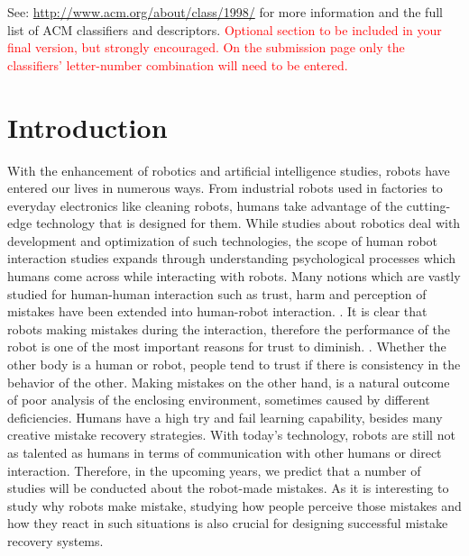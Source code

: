 \documentclass{sigchi}
\begin{document}

See: \url{http://www.acm.org/about/class/1998/}
for more information and the full list of ACM classifiers
and descriptors. \newline
\textcolor{red}{Optional section to be included in your final version, 
but strongly encouraged. On the submission page only the classifiers’ 
letter-number combination will need to be entered.}

\section{Introduction}

With the enhancement of robotics and artificial intelligence studies, robots have entered our lives in numerous ways. From industrial robots used in factories to everyday electronics like cleaning robots, humans take advantage of the cutting-edge technology that is designed for them. While studies about robotics deal with development and optimization of such technologies, the scope of human robot interaction studies expands through understanding psychological processes which humans come across while interacting with robots. Many notions which are vastly studied for human-human interaction such as trust, harm and perception of mistakes have been extended into human-robot interaction. \cite{freedy2007measurement}. It is clear that robots making mistakes during the interaction, therefore the performance of the robot is one of the most important reasons for trust to diminish. \cite{hancock2011meta}. Whether the other body is a human or robot, people tend to trust if there is consistency in the behavior of the other. Making mistakes on the other hand, is a natural outcome of poor analysis of the enclosing environment, sometimes caused by different deficiencies. Humans have a high try and fail learning capability, besides many creative mistake recovery strategies. With today's technology, robots are still not as talented as humans in terms of communication with other humans or direct interaction. Therefore, in the upcoming years, we predict that a number of studies will be conducted about the robot-made mistakes. As it is interesting to study why robots make mistake, studying how people perceive those mistakes and how they react in such situations is also crucial for designing successful mistake recovery systems.
\end{document}
